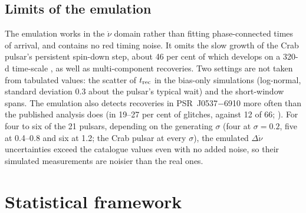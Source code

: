 \documentclass[fleqn,usenatbib]{mnras}
\newcommand{\psr}[1]{PSR~#1}
\begin{document}
\subsection{Limits of the emulation}\label{sec:emullimits}
The emulation works in the $\dot\nu$ domain rather than fitting
phase-connected times of arrival, and contains no red timing noise. It omits
the slow growth of the Crab pulsar's persistent spin-down step, about 46 per
cent of which develops on a 320-d time-scale \citep{lyne2015}, as well as
multi-component recoveries. Two settings are not taken from tabulated
values: the scatter of $t_{\rm rec}$ in the bias-only simulations
(log-normal, standard deviation 0.3 about the pulsar's typical wait) and the
short-window spans. The emulation also detects recoveries in
\psr{J0537$-$6910} more often than the published analysis does (in 19--27
per cent of glitches, against 12 of 66; \citealt{zubieta2026}). For four to
six of the 21 pulsars, depending on the generating $\sigma$ (four at
$\sigma=0.2$, five at 0.4--0.8 and six at 1.2; the Crab pulsar at every
$\sigma$), the emulated $\Delta\dot\nu$ uncertainties exceed the catalogue
values even with no added noise, so their simulated measurements are
noisier than the real ones.

\section{Statistical framework}\label{sec:stats}
\end{document}
